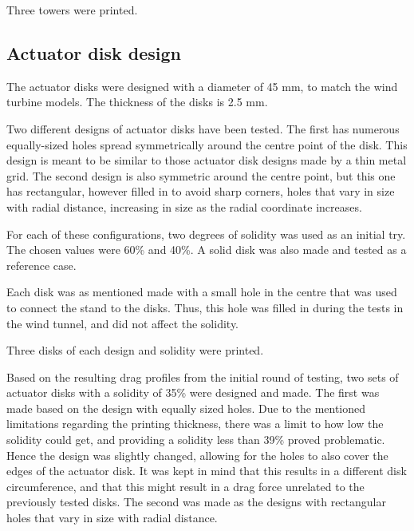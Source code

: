 Three towers were printed. 

\subsection{Actuator disk design}
The actuator disks were designed with a diameter of 45 mm, to match the wind turbine models. The thickness of the disks is 2.5 mm. 

Two different designs of actuator disks have been tested. The first has numerous equally-sized holes spread symmetrically around the centre point of the disk. This design is meant to be similar to those actuator disk designs made by a thin metal grid. The second design is also symmetric around the centre point, but this one has rectangular, however filled in to avoid sharp corners, holes that vary in size with radial distance, increasing in size as the radial coordinate increases. 

For each of these configurations, two degrees of solidity was used as an initial try. The chosen values were 60\% and 40\%. A solid disk was also made and tested as a reference case. 

Each disk was as mentioned made with a small hole in the centre that was used to connect the stand to the disks. Thus, this hole was filled in during the tests in the wind tunnel, and did not affect the solidity. 

Three disks of each design and solidity were printed.  

Based on the resulting drag profiles from the initial round of testing, two sets of actuator disks with a solidity of 35\% were designed and made. The first was made based on the design with equally sized holes. Due to the mentioned limitations regarding the printing thickness, there was a limit to how low the solidity could get, and providing a solidity less than 39\% proved problematic. Hence the design was slightly changed, allowing for the holes to also cover the edges of the actuator disk. It was kept in mind that this results in a different disk circumference, and that this might result in a drag force unrelated to the previously tested disks. The second was made as the designs with rectangular holes that vary in size with radial distance.  

